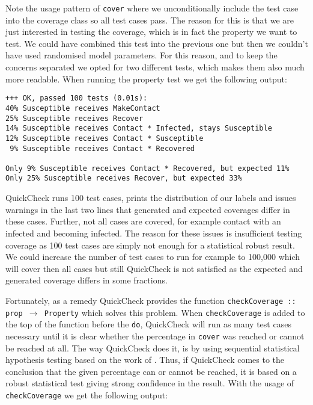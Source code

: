 Note the usage pattern of \texttt{cover} where we unconditionally include the test case into the coverage class so all test cases pass. The reason for this is that we are just interested in testing the coverage, which is in fact the property we want to test. We could have combined this test into the previous one but then we couldn't have used randomised model parameters. For this reason, and to keep the concerns separated we opted for two different tests, which makes them also much more readable. When running the property test we get the following output:

\begin{footnotesize}
\begin{verbatim}
+++ OK, passed 100 tests (0.01s):
40% Susceptible receives MakeContact
25% Susceptible receives Recover
14% Susceptible receives Contact * Infected, stays Susceptible
12% Susceptible receives Contact * Susceptible
 9% Susceptible receives Contact * Recovered
    
Only 9% Susceptible receives Contact * Recovered, but expected 11%
Only 25% Susceptible receives Recover, but expected 33%
\end{verbatim}
\end{footnotesize}

QuickCheck runs 100 test cases, prints the distribution of our labels and issues warnings in the last two lines that generated and expected coverages differ in these cases. Further, not all cases are covered, for example contact with an infected and becoming infected. The reason for these issues is insufficient testing coverage as 100 test cases are simply not enough for a statistical robust result. We could increase the number of test cases to run for example to 100,000 which will cover then all cases but still QuickCheck is not satisfied as the expected and generated coverage differs in some fractions.

Fortunately, as a remedy QuickCheck provides the function \texttt{checkCoverage :: prop $\rightarrow$ Property} which solves this problem. When \texttt{checkCoverage} is added to the top of the function before the \texttt{do}, QuickCheck will run as many test cases necessary until it is clear whether the percentage in \texttt{cover} was reached or cannot be reached at all. The way QuickCheck does it, is by using sequential statistical hypothesis testing based on the work of \cite{wald_sequential_1992}. Thus, if QuickCheck comes to the conclusion that the given percentage can or cannot be reached, it is based on a robust statistical test giving strong confidence in the result. With the usage of \texttt{checkCoverage} we get the following output:

